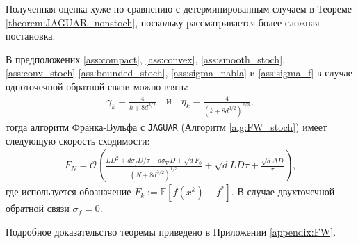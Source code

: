     Полученная оценка хуже по сравнению с детерминированным случаем в Теореме \ref{theorem:JAGUAR_nonstoch}, поскольку рассматривается более сложная постановка.

    \begin{theorem} \label{theorem:FW}
    
        В предположених \ref{ass:compact}, \ref{ass:convex}, \ref{ass:smooth_stoch}, \ref{ass:conv_stoch} \ref{ass:bounded_stoch}, \ref{ass:sigma_nabla} и \ref{ass:sigma_f} в случае одноточечной обратной связи можно взять: 
        \begin{align*}
           \gamma_k = \frac{4}{k + 8d^{3/2}} \quad \text{и} \quad \eta_k = \frac{4}{(k + 8d^{3/2})^{2/3}},
        \end{align*}
        тогда алгоритм Франка-Вульфа с \texttt{JAGUAR} (Алгоритм \ref{alg:FW_stoch}) имеет следующую скорость сходимости:
        \begin{align*}
            F_N = \mathcal{O} \left( \frac{L D^2 + d \sigma_f D/ \tau + d \sigma_\nabla D + \sqrt{d} F_0}{(N + 8d^{3/2})^{1/3}} + \sqrt{d} L D \tau + \frac{\sqrt{d} \Delta D}{\tau} \right),
        \end{align*}
        где используется обозначение $F_k := \mathbb{E} \left[ f(x^{k}) - f^* \right]$. В случае двухточечной обратной связи $\sigma_f = 0$.

        \noindent Подробное доказательство теоремы приведено в Приложении \ref{appendix:FW}.
            
    \end{theorem}

